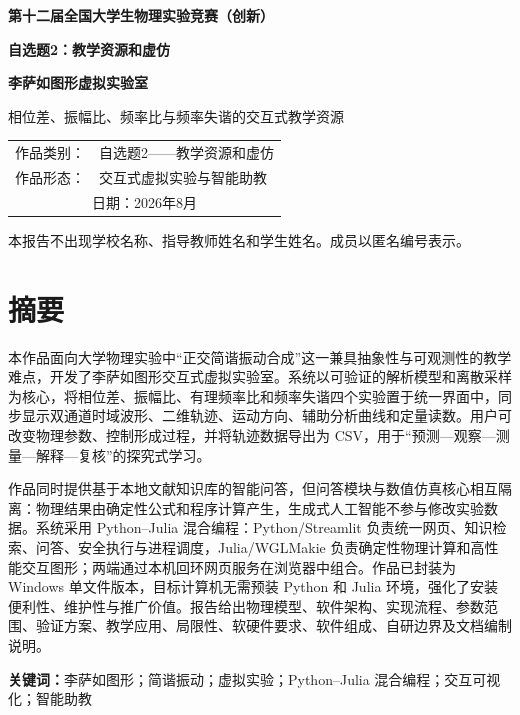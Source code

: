 \documentclass[UTF8,a4paper,zihao=-4]{ctexart}
\begin{document}
\hypersetup{pageanchor=false}
\begin{titlepage}
\thispagestyle{empty}
  \centering
  \vspace*{1.5cm}
  {\bfseries 第十二届全国大学生物理实验竞赛（创新）\par}
  \vspace{0.8cm}
  {\bfseries 自选题2：教学资源和虚仿\par}
  \vspace{1.8cm}
  {\bfseries 李萨如图形虚拟实验室\par}
  \vspace{0.4cm}
  {相位差、振幅比、频率比与频率失谐的交互式教学资源\par}
  \vfill
  \begin{tabular}{rl}
    作品类别：& 自选题2——教学资源和虚仿\\
    作品形态：& 交互式虚拟实验与智能助教\\
    \multicolumn{2}{c}{日期：\quad 2026年8月}
  \end{tabular}
  \vfill
  {\small 本报告不出现学校名称、指导教师姓名和学生姓名。成员以匿名编号表示。}
\end{titlepage}
\hypersetup{pageanchor=true}

\section*{摘要}
本作品面向大学物理实验中“正交简谐振动合成”这一兼具抽象性与可观测性的教学难点，开发了李萨如图形交互式虚拟实验室。系统以可验证的解析模型和离散采样为核心，将相位差、振幅比、有理频率比和频率失谐四个实验置于统一界面中，同步显示双通道时域波形、二维轨迹、运动方向、辅助分析曲线和定量读数。用户可改变物理参数、控制形成过程，并将轨迹数据导出为 CSV，用于“预测—观察—测量—解释—复核”的探究式学习。

作品同时提供基于本地文献知识库的智能问答，但问答模块与数值仿真核心相互隔离：物理结果由确定性公式和程序计算产生，生成式人工智能不参与修改实验数据。系统采用 Python--Julia 混合编程：Python/Streamlit 负责统一网页、知识检索、问答、安全执行与进程调度，Julia/WGLMakie 负责确定性物理计算和高性能交互图形；两端通过本机回环网页服务在浏览器中组合。作品已封装为 Windows 单文件版本，目标计算机无需预装 Python 和 Julia 环境，强化了安装便利性、维护性与推广价值。报告给出物理模型、软件架构、实现流程、参数范围、验证方案、教学应用、局限性、软硬件要求、软件组成、自研边界及文档编制说明。

\noindent\textbf{关键词：}李萨如图形；简谐振动；虚拟实验；Python--Julia 混合编程；交互可视化；智能助教
\clearpage
\tableofcontents
\clearpage
{}
\end{document}
